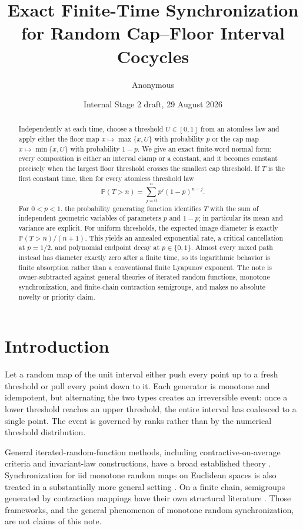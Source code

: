 \documentclass[11pt,a4paper]{amsart}
\title[Random cap--floor synchronization]{Exact Finite-Time Synchronization for Random Cap--Floor Interval Cocycles}
\author{Anonymous}
\date{Internal Stage 2 draft, 29 August 2026}
\theoremstyle{definition}
\theoremstyle{remark}
\newcommand{\Prob}{\mathbb P}
\begin{document}
\begin{abstract}
Independently at each time, choose a threshold $U\in[0,1]$ from an
atomless law and apply either the floor map $x\mapsto\max\{x,U\}$ with
probability $p$ or the cap map $x\mapsto\min\{x,U\}$ with probability
$1-p$.  We give an exact finite-word normal form: every composition is
either an interval clamp or a constant, and it becomes constant precisely
when the largest floor threshold crosses the smallest cap threshold.  If
$T$ is the first constant time, then for every atomless threshold law
\[
 \Prob(T>n)=\sum_{j=0}^n p^j(1-p)^{n-j}.
\]
For $0<p<1$, the probability generating function identifies $T$ with the
sum of independent geometric variables of parameters $p$ and $1-p$; in
particular its mean and variance are explicit.  For uniform thresholds,
the expected image diameter is exactly $\Prob(T>n)/(n+1)$.  This yields an
annealed exponential rate, a critical cancellation at $p=1/2$, and
polynomial endpoint decay at $p\in\{0,1\}$.  Almost every mixed path instead
has diameter exactly zero after a finite time, so its logarithmic behavior
is finite absorption rather than a conventional finite Lyapunov exponent.
The note is owner-subtracted against general theories of iterated random
functions, monotone synchronization, and finite-chain contraction
semigroups, and makes no absolute novelty or priority claim.
\end{abstract}

\maketitle

\section{Introduction}

Let a random map of the unit interval either push every point up to a fresh
threshold or pull every point down to it.  Each generator is monotone and
idempotent, but alternating the two types creates an irreversible event:
once a lower threshold reaches an upper threshold, the entire interval has
coalesced to a single point.  The event is governed by ranks rather than by
the numerical threshold distribution.

General iterated-random-function methods, including contractive-on-average
criteria and invariant-law constructions, have a broad established theory
\cite{DiaconisFreedman1999}.  Synchronization for iid monotone random maps
on Euclidean spaces is also treated in a substantially more general setting
\cite{MatiasSilva2021}.  On a finite chain, semigroups generated by
contraction mappings have their own structural literature
\cite{Umar2021}.  Those frameworks, and the general phenomenon of monotone
random synchronization, are not claims of this note.
\end{document}
